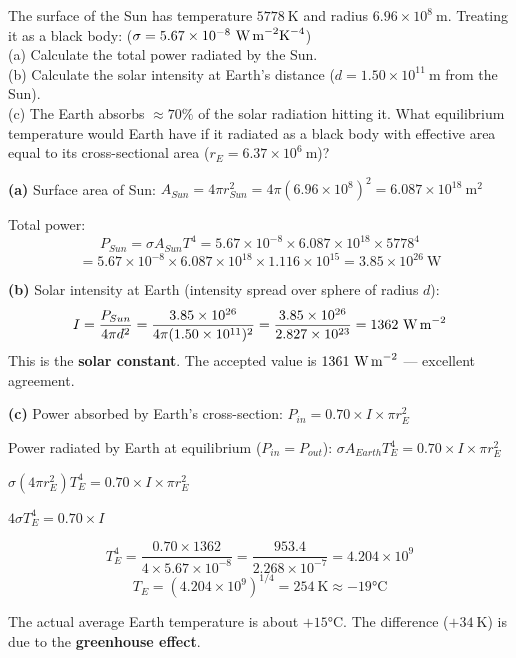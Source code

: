 \begin{examplebox}[16.3]
The surface of the Sun has temperature
$5778\ \text{K}$ and radius $6.96\times10^8\ \text{m}$.
Treating it as a black body:
($\sigma = 5.67\times10^{-8}\ \text{W\,m}^{-2}\text{K}^{-4}$)\\
(a) Calculate the total power radiated by the Sun.\\
(b) Calculate the solar intensity at Earth's
distance ($d = 1.50\times10^{11}\ \text{m}$ from
the Sun).\\
(c) The Earth absorbs $\approx 70\%$ of the solar
radiation hitting it. What equilibrium temperature
would Earth have if it radiated as a black body with
effective area equal to its cross-sectional area
($r_E = 6.37\times10^6\ \text{m}$)?
\end{examplebox}

\begin{solutionbox}
\textbf{(a)} Surface area of Sun:
$A_{Sun} = 4\pi r_{Sun}^2
= 4\pi(6.96\times10^8)^2
= 6.087\times10^{18}\ \text{m}^2$

Total power:
\[
  P_{Sun} = \sigma A_{Sun} T^4
  = 5.67\times10^{-8} \times 6.087\times10^{18}
  \times 5778^4
\]
\[
  = 5.67\times10^{-8} \times 6.087\times10^{18}
  \times 1.116\times10^{15}
  = 3.85\times10^{26}\ \text{W}
\]

\textbf{(b)} Solar intensity at Earth (intensity
spread over sphere of radius $d$):
\[
  I = \frac{P_{Sun}}{4\pi d^2}
  = \frac{3.85\times10^{26}}
    {4\pi(1.50\times10^{11})^2}
  = \frac{3.85\times10^{26}}
    {2.827\times10^{23}}
  = 1362\ \text{W\,m}^{-2}
\]
This is the \textbf{solar constant}. The accepted
value is $1361\ \text{W\,m}^{-2}$ --- excellent
agreement.

\textbf{(c)} Power absorbed by Earth's cross-section:
$P_{in} = 0.70 \times I \times \pi r_E^2$

Power radiated by Earth at equilibrium ($P_{in}
= P_{out}$):
$\sigma A_{Earth} T_E^4 = 0.70 \times I \times
\pi r_E^2$

$\sigma (4\pi r_E^2) T_E^4 = 0.70 \times I
\times \pi r_E^2$

$4\sigma T_E^4 = 0.70 \times I$

\[
  T_E^4 = \frac{0.70 \times 1362}
    {4 \times 5.67\times10^{-8}}
  = \frac{953.4}{2.268\times10^{-7}}
  = 4.204\times10^9
\]
\[
  T_E = (4.204\times10^9)^{1/4}
  = 254\ \text{K} \approx -19°\text{C}
\]

The actual average Earth temperature is about
$+15°\text{C}$. The difference ($+34\ \text{K}$)
is due to the \textbf{greenhouse effect}.
\end{solutionbox}

